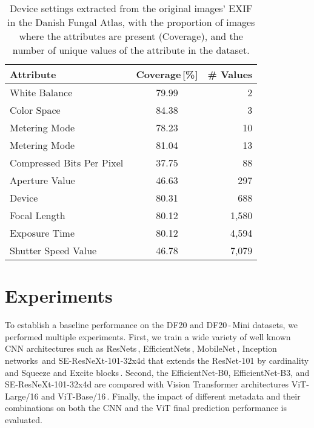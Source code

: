 \documentclass[10pt,twocolumn,letterpaper]{article}
\begin{document}
\begin{table}[b!]
\begin{center}
\renewcommand{\arraystretch}{1.15}
\setlength{\tabcolsep}{0.4em}
\begin{tabular}{|l|c|r|}
\hline
Attribute & Coverage\,[\%] & \# Values \\
\hline
White Balance                 & 79.99 &     2 \\
Color Space                   & 84.38 &     3 \\
Metering Mode                 & 78.23 &    10 \\
Metering Mode                 & 81.04 &    13 \\
Compressed Bits Per Pixel\,\, & 37.75 &    88 \\
Aperture Value                & 46.63 &   297 \\
Device                        & 80.31 &   688 \\
Focal Length                  & 80.12 & 1,580 \\
Exposure Time                 & 80.12 & 4,594 \\
Shutter Speed Value           & 46.78 & 7,079 \\
\hline
\end{tabular}
\end{center}
\caption{Device settings extracted from the original images' EXIF in the Danish Fungal Atlas, with the proportion of images where the attributes are present (Coverage), and the number of unique values of the attribute in the dataset.}
\label{table:exif_values}
\end{table}

\section{Experiments}
\label{experiments}

To establish a baseline performance on the DF20 and DF20\,-\,Mini datasets, we performed multiple experiments. First, we train a wide variety of well known CNN architectures such as ResNets\,\cite{resnets}, EfficientNets\,\cite{tan2019efficientnet}, MobileNet\,\cite{sandler2018mobilenetv2}, Inception networks\,\cite{inceptions} and \mbox{SE-ResNeXt-101-32x4d} that extends the ResNet-101 by cardinality\,\cite{next} and Squeeze and Excite blocks\,\cite{SE_Net}. Second, the EfficientNet-B0, EfficientNet-B3, and \mbox{SE-ResNeXt-101-32x4d} are compared with Vision Transformer architectures  ViT-Large/16 and ViT-Base/16\,\cite{vit}. Finally, the impact of different metadata and their combinations on both the CNN and the ViT final prediction performance is evaluated.
\end{document}
